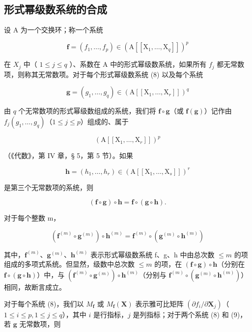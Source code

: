 \subsection{形式幂级数系统的合成}

设 A 为一个交换环；称一个系统

\[
\mathbf {f} = (f _ {1}, \dots , f _ {p}) \in (\mathrm{A} [ [ \mathrm{X} _ {1}, \dots , \mathrm{X} _ {q} ] ]) ^ {p}\tag{8}
\]

在 \(X_{j}\) 中（ \(1 \leqslant j \leqslant q\) ）、系数在 A 中的形式幂级数系统，如果所有 \(f_{j}\) 都无常数项，则称其无常数项。对于每个形式幂级数系统 (8) 以及每个系统

\[
\mathbf {g} = (g _ {1}, \dots , g _ {q}) \in (\mathrm{A} [ [ \mathrm{X} _ {1}, \dots , \mathrm{X} _ {r} ] ]) ^ {q}\tag{9}
\]

由 \(q\) 个无常数项的形式幂级数组成的系统，我们将 \(\mathbf{f} \circ \mathbf{g}\)（或 \(\mathbf{f}(\mathbf{g})\)）记作由 \(f_{j}(g_{1},\ldots ,g_{q})\)（\(1\leqslant j\leqslant p\)）组成的、属于

\[
\left. \left(\mathrm{A} \left[ \left[ \mathrm{X} _ {1}, \dots , \mathrm{X} _ {r} \right] \right]\right) ^ {p} \right.
\]

（《代数》，第 IV 章，§ 5，第 5 节）。如果

\[
\mathbf {h} = (h _ {1}, \dots , h _ {r}) \in (\mathrm{A} [ [ \mathrm{X} _ {1}, \dots , \mathrm{X} _ {s} ] ]) ^ {r}
\]

是第三个无常数项的系统，则

\[
(\mathbf {f} \circ \mathbf {g}) \circ \mathbf {h} = \mathbf {f} \circ (\mathbf {g} \circ \mathbf {h}).\tag{10}
\]

对于每个整数 m，

\[
\left(\mathbf {f} ^ {(m)} \circ \mathbf {g} ^ {(m)}\right) \circ \mathbf {h} ^ {(m)} = \mathbf {f} ^ {(m)} \circ \left(\mathbf {g} ^ {(m)} \circ \mathbf {h} ^ {(m)}\right)
\]

其中，\(\mathbf{f}^{(m)}\)、\(\mathbf{g}^{(m)}\)、\(\mathbf{h}^{(m)}\) 表示形式幂级数系统 f、g、h 中由总次数 \(\leqslant m\) 的项组成的多项式系统。但显然，级数中总次数 \(\leqslant m\) 的项，在 \((\mathbf{f} \circ \mathbf{g}) \circ \mathbf{h}\)（分别在 \(\mathbf{f} \circ (\mathbf{g} \circ \mathbf{h})\)）中，与 \((\mathbf{f}^{(m)} \circ \mathbf{g}^{(m)}) \circ \mathbf{h}^{(m)}\)（分别与 \(\mathbf{f}^{(m)} \circ (\mathbf{g}^{(m)} \circ \mathbf{h}^{(m)})\)）相同，故断言成立。

对于每个系统 (8)，我们以 \(M_{\mathbf{f}}\) 或 \(M_{\mathbf{f}}(\mathbf{X})\) 表示雅可比矩阵 \((\partial f_i / \partial \mathbf{X}_j)\)（ \(1 \leqslant i \leqslant p, 1 \leqslant j \leqslant q\)），其中 \(i\) 是行指标，\(j\) 是列指标；对于两个系统 (8) 和 (9)，若 \(\mathbf{g}\) 无常数项，则

